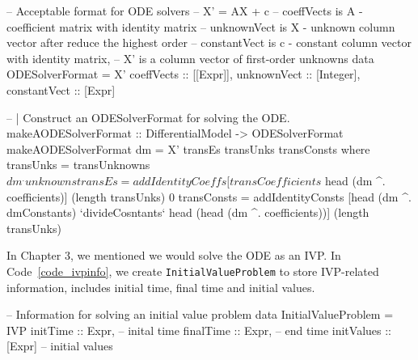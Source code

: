 \begin{listing}[ht]
\begin{haskell1}
-- Acceptable format for ODE solvers
-- X' = AX + c
-- coeffVects is A - coefficient matrix with identity matrix
-- unknownVect is X - unknown column vector after reduce the highest order
-- constantVect is c - constant column vector with identity matrix, 
-- X' is a column vector of first-order unknowns
data ODESolverFormat = X'{
  coeffVects :: [[Expr]],
  unknownVect :: [Integer],
  constantVect :: [Expr]
}

-- | Construct an ODESolverFormat for solving the ODE.
makeAODESolverFormat :: DifferentialModel -> ODESolverFormat
makeAODESolverFormat dm = X' transEs transUnks transConsts
  where transUnks = transUnknowns $ dm ^. unknowns
        transEs = addIdentityCoeffs [transCoefficients $ head (dm ^. coefficients)] (length transUnks) 0
        transConsts = addIdentityConsts [head (dm ^. dmConstants) `divideCosntants` head (head (dm ^. coefficients))] (length transUnks)
\end{haskell1}
\label{code_odesolverformat}
\end{listing}

In Chapter 3, we mentioned we would solve the ODE as an IVP. In Code~\ref{code_ivpinfo}, we create \verb|InitialValueProblem| to store IVP-related information, includes initial time, final time and initial values.
\begin{listing}[ht]
\begin{haskell1}
-- Information for solving an initial value problem
data InitialValueProblem = IVP{
  initTime :: Expr, -- inital time
  finalTime :: Expr, -- end time
  initValues :: [Expr] -- initial values
}
\end{haskell1}
\label{code_ivpinfo}
\end{listing}

